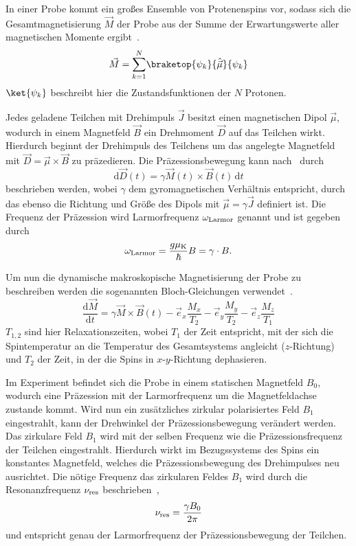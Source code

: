 \documentclass[paper=a4,
	fontsize=10pt,
	DIV=18,
	twocolumn,
	parskip=half
	]{scrartcl}
\numberwithin{equation}{section}    %
\begin{document}
In einer Probe kommt ein großes Ensemble von Protenenspins vor, sodass sich die Gesamtmagnetisierung $\vec{M}$ der Probe aus der Summe der Erwartungswerte aller magnetischen Momente ergibt~\citep{anleitung}.
\begin{equation}
	\vec{M} = \underset{k=1}{\overset{N}{\sum}} \braketop{\psi_k}{\hat{\vec{\mu}}}{\psi_k}
\end{equation}
$\ket{\psi_k}$ beschreibt hier die Zustandsfunktionen der $N$ Protonen.

Jedes geladene Teilchen mit Drehimpuls $\vec{J}$ besitzt einen magnetischen Dipol $\vec{\mu}$, wodurch in einem Magnetfeld $\vec{B}$ ein Drehmoment $\vec{D}$ auf das Teilchen wirkt. Hierdurch beginnt der Drehimpuls des Teilchens um das angelegte Magnetfeld mit $\vec{D} = \vec{\mu} \times \vec{B}$ zu präzedieren. Die Präzessionsbewegung kann nach~\citet{anleitung} durch
\begin{equation}
	\mathrm{d}\vec{D}(t) = \gamma\vec{M}(t) \times \vec{B}(t)\,\mathrm{d}t
\end{equation}
beschrieben werden, wobei $\gamma$ dem gyromagnetischen Verhältnis entspricht, durch das ebenso die Richtung und Größe des Dipols mit $\vec{\mu} = \gamma\vec{J}$ definiert ist.
Die Frequenz der Präzession wird Larmorfrequenz $\omega_{\rm Larmor}$ genannt und ist gegeben durch~\citep{mueller}
\begin{equation}
	\omega_{\rm Larmor} = \frac{g \mu_{\rm K}}{\hbar}B = \gamma \cdot B.
\end{equation}

Um nun die dynamische makroskopische Magnetisierung der Probe zu beschreiben werden die sogenannten Bloch-Gleichungen verwendet~\citep{anleitung}.
\begin{equation}
	\frac{\mathrm{d}\vec{M}}{\mathrm{d}t} = \gamma\vec{M} \times \vec{B}(t) - \vec{e}_x \frac{M_x}{T_2} - \vec{e}_y \frac{M_y}{T_2} - \vec{e}_z \frac{M_z}{T_1}
	\label{bloch}
\end{equation}
$T_{1,2}$ sind hier Relaxationszeiten, wobei $T_{1}$ der Zeit entspricht, mit der sich die Spintemperatur an die Temperatur des Gesamtsystems angleicht ($z$-Richtung) und $T_2$ der Zeit, in der die Spins in $x$-$y$-Richtung dephasieren.

Im Experiment befindet sich die Probe in einem statischen Magnetfeld $B_0$, wodurch eine Präzession mit der Larmorfrequenz um die Magnetfeldachse zustande kommt. Wird nun ein zusätzliches zirkular polarisiertes Feld $B_1$ eingestrahlt, kann der Drehwinkel der Präzessionsbewegung verändert werden. Das zirkulare Feld $B_1$ wird mit der selben Frequenz wie die Präzessionsfrequenz der Teilchen eingestrahlt. Hierdurch wirkt im Bezugssystems des Spins ein konstantes Magnetfeld, welches die Präzessionsbewegung des Drehimpulses neu ausrichtet. Die nötige Frequenz das zirkularen Feldes $B_1$ wird durch die Resonanzfrequenz $\nu_{\rm res}$ beschrieben~\citep{anleitung},
\begin{equation}
	\nu_{\rm res} = \frac{\gamma B_0}{2\pi}
\end{equation}
und entspricht genau der Larmorfrequenz der Präzessionsbewegung der Teilchen.
\end{document}
